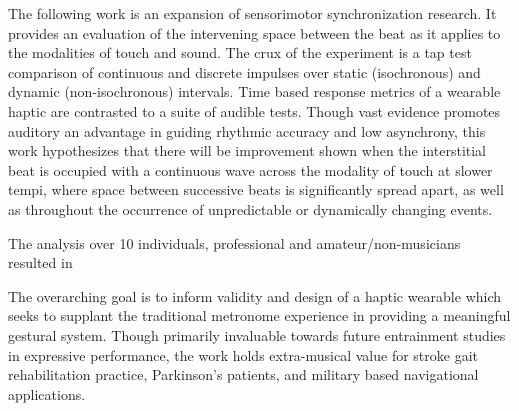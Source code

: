 
\setlength{\parskip}{1em}
\setlength{\parindent}{0em}

\noindent

The following work is an expansion of sensorimotor synchronization research. It provides an evaluation of the intervening space between the beat as it applies to the modalities of touch and sound. The crux of the experiment is a tap test comparison of continuous and discrete impulses over static (isochronous) and dynamic (non-isochronous) intervals. Time based response metrics of a wearable haptic are contrasted to a suite of audible tests. Though vast evidence promotes auditory an advantage in guiding rhythmic accuracy and low asynchrony, this work hypothesizes that there will be improvement shown when the interstitial beat is occupied with a continuous wave across the modality of touch at slower tempi, where space between successive beats is significantly spread apart, as well as throughout the occurrence of unpredictable or dynamically changing events. 

The analysis over 10 individuals, professional and amateur/non-musicians resulted in 


The overarching goal is to inform validity and design of a haptic wearable which seeks to supplant the traditional metronome experience in providing a meaningful gestural system. Though primarily invaluable towards future entrainment studies in expressive performance, the work holds extra-musical value for stroke gait rehabilitation practice, Parkinson's patients, and military based navigational applications.